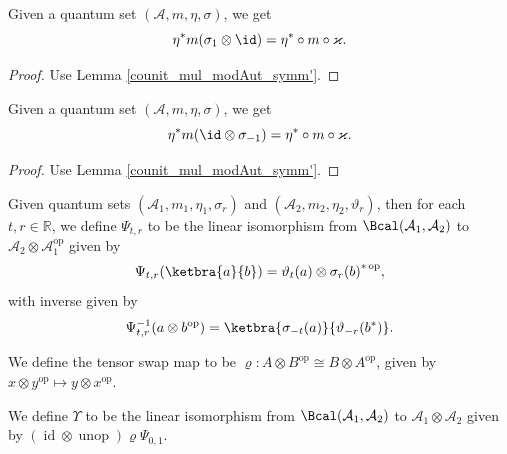  \begin{corollary}\label{moving_twists}
  \leanok
  Given a quantum set $(\mathcal{A},m,\eta,\sigma)$, we get
  \[\eta^* m(\sigma_{1}\otimes\id)=\eta^*\circ m\circ\varkappa.\]
 \end{corollary}
 \begin{proof}\leanok
  Use Lemma \ref{counit_mul_modAut_symm'}.
 \end{proof}
 \begin{corollary}\label{moving_twists_2}
  \leanok
  Given a quantum set $(\mathcal{A},m,\eta,\sigma)$, we get
  \[\eta^* m(\id\otimes\sigma_{-1})=\eta^*\circ m\circ\varkappa.\]
 \end{corollary}
 \begin{proof}\leanok
  Use Lemma \ref{counit_mul_modAut_symm'}.
 \end{proof}
 
 \begin{definition}\label{QuantumSet.Psi}
  \leanok
  Given quantum sets $(\mathcal{A}_1,m_1,\eta_1,\sigma_r)$ and $(\mathcal{A}_2,m_2,\eta_2,\vartheta_r)$, then for each $t,r\in\mathbb{R}$, we define $\Psi_{t,r}$ to be the linear isomorphism from $\Bcal(\mathcal{A}_1,\mathcal{A}_2)$ to $\mathcal{A}_2\otimes\mathcal{A}_1^{\operatorname{op}}$ given by
  \[\Psi_{t,r}(\ketbra{a}{b})=\vartheta_t(a)\otimes{\sigma_r(b)}^{*\operatorname{op}},\]
  with inverse given by
  \[\Psi_{t,r}^{-1}(a\otimes b^{\operatorname{op}})=\ketbra{\sigma_{-t}(a)}{\vartheta_{-r}(b^*)}.\]
 \end{definition}

 \begin{definition}\label{tenSwap}
  \leanok
  We define the tensor swap map to be $\varrho\colon A\otimes B^{\operatorname{op}}\cong B\otimes A^{\operatorname{op}}$, given by $x\otimes y^{\operatorname{op}}\mapsto y\otimes x^{\operatorname{op}}$.
 \end{definition}

 \begin{definition}\label{Upsilon}
  \leanok
  We define $\Upsilon$ to be the linear isomorphism from $\Bcal(\mathcal{A}_1,\mathcal{A}_2)$ to $\mathcal{A}_1\otimes\mathcal{A}_2$ given by $(\operatorname{id}\otimes\operatorname{unop})\varrho\Psi_{0,1}$.
 \end{definition}

